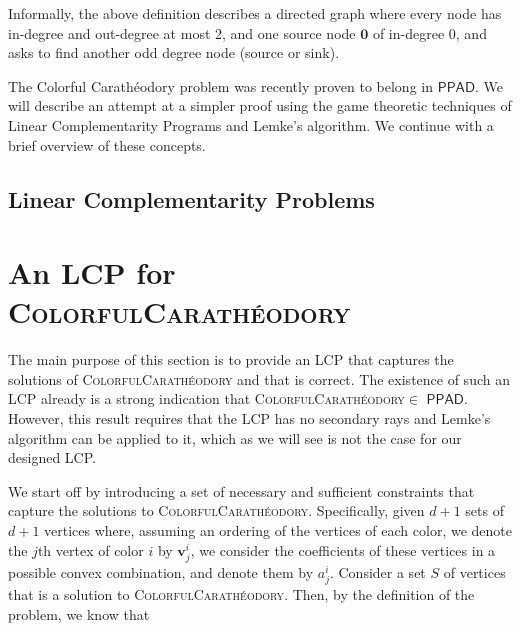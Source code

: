 \documentclass[a4paper,11pt]{article}
\def\cc#1{\mathsf{#1}}
\def\PPAD{\ensuremath{\cc{PPAD}}\xspace}
\def\problem#1{\textsc{#1}}
\def\CC{Colorful Carath\'eodory }
\def\org{\bm{0}}
\def\v{\textbf{v}}
\def\CCP{\problem{ColorfulCarath\'eodory}\xspace}
\begin{document}
\par Informally, the above definition describes a directed graph where every node has in-degree and out-degree at most $2$, and one source node $\org$ of in-degree $0$, and asks to find another odd degree node (source or sink). 

\par The \CC problem was recently proven to belong in \PPAD \cite{CCP_PPAD}. We will describe an attempt at a simpler proof using the game theoretic techniques of Linear Complementarity Programs and Lemke's algorithm. We continue with a brief overview of these concepts.

\subsection{Linear Complementarity Problems}


\section{An LCP for \CCP}

\par The main purpose of this section is to provide an LCP that captures the solutions of \CCP and that is
correct. The existence of such an LCP already is a strong indication that \CCP $\in$ \PPAD. However, this
result requires that the LCP has no secondary rays and Lemke's algorithm can be applied to it, which as we
will see is not the case for our designed LCP.

\par We start off by introducing a set of necessary and sufficient constraints that capture the solutions to
\CCP. Specifically, given $d+1$ sets of $d+1$ vertices where, assuming an ordering of the vertices of each
color, we denote the $j$th vertex of color $i$ by $\v^i_j$, we consider the coefficients of these vertices in
a possible convex combination, and denote them by $a^i_j$. Consider a set $S$ of vertices that is a solution to
\CCP. Then, by the definition of the problem, we know that
\end{document}
